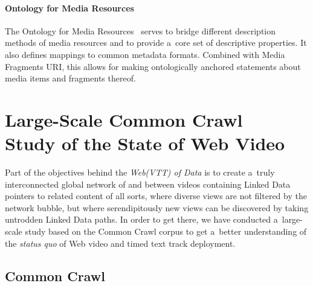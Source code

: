\documentclass{sig-alternate}
\begin{document}
\paragraph{Ontology for Media Resources}

The Ontology for Media Resources~\cite{lee2012mediaontology}
serves to bridge different description methods of media resources
and to provide a~core set of descriptive properties.
It also defines mappings to common metadata formats.
Combined with Media Fragments URI,
this allows for making ontologically anchored statements
about media items and fragments thereof.

\section{Large-Scale Common Crawl\\ Study of the State of Web Video}

Part of the objectives behind the \emph{Web(VTT) of Data}
is to create a~truly interconnected global network of and between videos
containing Linked Data pointers to related content of all sorts,
where diverse views are not filtered by the network bubble, 
but where serendipitously new views can be discovered
by taking untrodden Linked Data paths.
In order to get there,
we have conducted a~large-scale study
based on the Common Crawl corpus to get a~better understanding
of the \emph{status quo} of Web video and timed text track deployment.

\subsection{Common Crawl}
\end{document}
